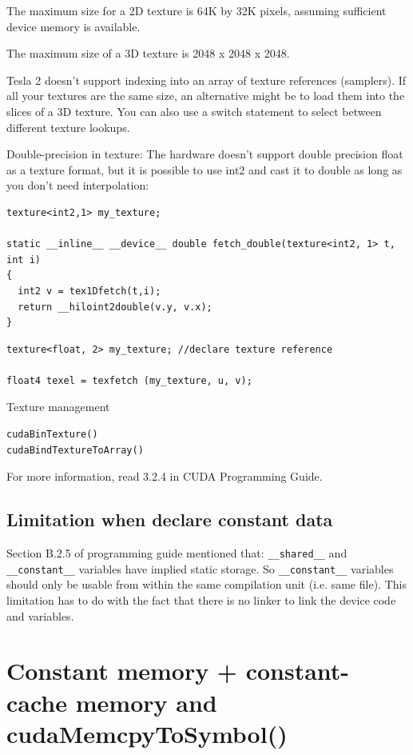 The maximum size for a 2D texture is 64K by 32K pixels, assuming
sufficient device memory is available.

The maximum size of a 3D texture is 2048 x 2048 x 2048.

Tesla 2 doesn't support indexing into an array of texture references
(samplers). If all your textures are the same size, an alternative
might be to load them into the slices of a 3D texture. You can also
use a switch statement to select between different texture lookups.

Double-precision in texture: The hardware doesn't support double
precision float as a texture format, but it is possible to use int2
and cast it to double as long as you don't need interpolation:

\begin{lstlisting}
texture<int2,1> my_texture;

static __inline__ __device__ double fetch_double(texture<int2, 1> t, int i)
{
  int2 v = tex1Dfetch(t,i);
  return __hiloint2double(v.y, v.x);
}
\end{lstlisting}

\begin{lstlisting}
texture<float, 2> my_texture; //declare texture reference

float4 texel = texfetch (my_texture, u, v);
\end{lstlisting}

Texture management
\begin{lstlisting}
cudaBinTexture()
cudaBindTextureToArray()
\end{lstlisting}


For more information, read 3.2.4 in CUDA Programming Guide.

\subsection{Limitation when declare constant data}
\label{sec:limit-when-decl}

Section B.2.5 of programming guide mentioned that: \verb!__shared__!
and \verb!__constant__! variables have implied static storage.  So
\verb!__constant__! variables should only be usable from within the
same compilation unit (i.e. same file). This limitation has to do with
the fact that there is no linker to link the device code and
variables.


\section{Constant memory + constant-cache memory and cudaMemcpyToSymbol()}
\label{sec:constant-memory}
\label{sec:constant-cache-memory}
\label{sec:cudaMemcpyToSymbol}


